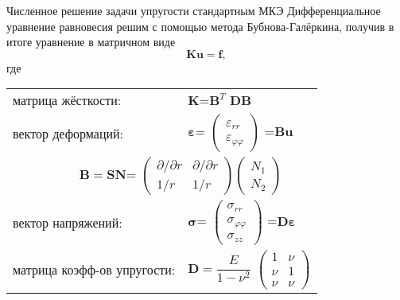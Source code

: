 \documentclass{beamer}
\begin{document}
\begin{frame}{Численное решение задачи упругости стандартным МКЭ}
\small
Дифференциальное уравнение равновесия решим с помощью метода Бубнова-Галёркина, получив в итоге уравнение в матричном виде
\begin{equation*}
\mathbf{Ku}=\mathbf{f},
\end{equation*}
где 
\vspace{-0.2em}
\begin{table}[h]
\begin{tabular}{p{9em}l}
матрица жёсткости: & $\mathbf{K}$=$\mathbf{B}^T$ $\mathbf{D}\mathbf{B}$ \\ 
вектор деформаций: & $\bm{\varepsilon}$=
$
\begin{pmatrix}
\varepsilon_{r r} \\
\varepsilon_{\varphi \varphi}
\end{pmatrix}
$
=$\mathbf{B}\mathbf{u}$ \\
\multicolumn{2}{c}{
$ \hspace{3em} \mathbf{B}=\mathbf{S}\mathbf{N}$=
$
\begin{pmatrix}
\partial / \partial r & \partial / \partial r \\
1/r & 1/r
\end{pmatrix}
\begin{pmatrix}
N_1 \\
N_2
\end{pmatrix}
$
} \\
вектор напряжений: & $\bm{\sigma}$=
$
\begin{pmatrix}
\sigma_{rr} \\
\sigma_{\varphi \varphi} \\
\sigma_{zz}
\end{pmatrix}
$
=$\mathbf{D}\bm{\varepsilon}$ \\
матрица коэфф-ов упругости: & $\mathbf{D}=\dfrac{E}{1-\nu^2}$
$
\begin{pmatrix}
1 & \nu \\
\nu & 1  \\
\nu & \nu 
\end{pmatrix}
$
\end{tabular}
\end{table}

\end{frame}
\end{document}
